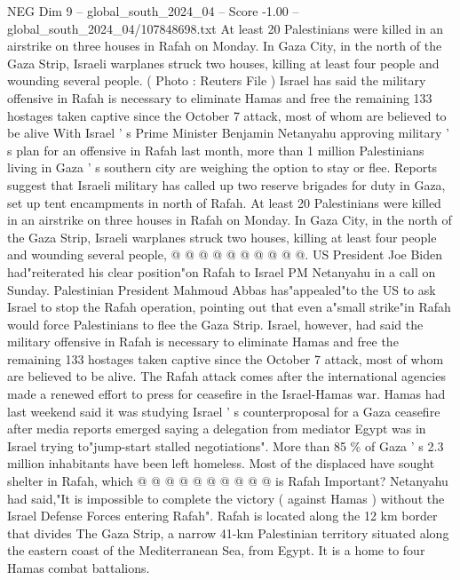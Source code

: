 \begin{textsample}{NEG Dim 9 – global\_south\_2024\_04 – Score -1.00 – global\_south\_2024\_04/107848698.txt}  \label{ex:f9_neg_381}
At least 20 Palestinians were killed in an airstrike on three houses in Rafah on Monday.
In Gaza City, in the north of the Gaza Strip, Israeli warplanes struck two houses, killing at least four people and wounding several people. ( Photo : Reuters File ) Israel has said the military offensive in Rafah is necessary to eliminate Hamas and free the remaining 133 hostages taken captive since the October 7 attack, most of whom are believed to be alive With Israel ' s Prime Minister Benjamin Netanyahu approving military ' s plan for an offensive in Rafah last month, more than 1 million Palestinians living in Gaza ' s southern city are weighing the option to stay or flee.
Reports suggest that Israeli military has called up two reserve brigades for duty in Gaza, set up tent encampments in north of Rafah.
At least 20 Palestinians were killed in an airstrike on three houses in Rafah on Monday.
In Gaza City, in the north of the Gaza Strip, Israeli warplanes struck two houses, killing at least four people and wounding several people, @ @ @ @ @ @ @ @ @ @.
US President Joe Biden had"reiterated his clear position"on Rafah to Israel PM Netanyahu in a call on Sunday.
Palestinian President Mahmoud Abbas has"appealed"to the US to ask Israel to stop the Rafah operation, pointing out that even a"small strike"in Rafah would force Palestinians to flee the Gaza Strip.
Israel, however, had said the military offensive in Rafah is necessary to eliminate Hamas and free the remaining 133 hostages taken captive since the October 7 attack, most of whom are believed to be alive.
The Rafah attack comes after the international agencies made a renewed effort to press for ceasefire in the Israel-Hamas war.
Hamas had last weekend said it was studying Israel ' s counterproposal for a Gaza ceasefire after media reports emerged saying a delegation from mediator Egypt was in Israel trying to"jump-start stalled negotiations".
More than 85 \% of Gaza ' s 2.3 million inhabitants have been left homeless.
Most of the displaced have sought shelter in Rafah, which @ @ @ @ @ @ @ @ @ @ is Rafah Important?
Netanyahu had said,"It is impossible to complete the victory ( against Hamas ) without the Israel Defense Forces entering Rafah".
Rafah is located along the 12 km border that divides The Gaza Strip, a narrow 41-km Palestinian territory situated along the eastern coast of the Mediterranean Sea, from Egypt.
It is a home to four Hamas combat battalions.

\end{textsample}
